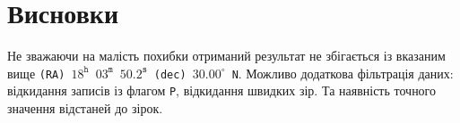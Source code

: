 \documentclass[12pt]{article}
\begin{document}
\section*{Висновки}

  Не зважаючи на малість похибки отриманий результат не збігається із вказаним вище \texttt{(RA) $18^{\texttt{h}}$ $03^{\texttt{m}}$ $50.2^{\texttt{s}}$ (dec) $30.00^{\circ}$ N}. Можливо додаткова фільтрація даних: відкидання записів із флагом \texttt{P}, відкидання швидких зір. Та наявність точного значення відстаней до зірок.
\end{document}
